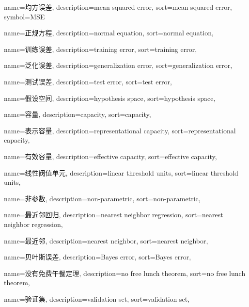 {
  name=均方误差,
  description={mean squared error},
  sort={mean squared error},
  symbol={MSE}
}

{
  name=正规方程,
  description={normal equation},
  sort={normal equation},
}

{
  name=训练误差,
  description={training error},
  sort={training error},
}

{
  name=泛化误差,
  description={generalization error},
  sort={generalization error},
}

{
  name=测试误差,
  description={test error},
  sort={test error},
}

{
  name=假设空间,
  description={hypothesis space},
  sort={hypothesis space},
}

{
  name=容量,
  description={capacity},
  sort={capacity},
}

{
  name=表示容量,
  description={representational capacity},
  sort={representational capacity},
}

{
  name=有效容量,
  description={effective capacity},
  sort={effective capacity},
}

{
	name=线性阀值单元,
	description={linear threshold units},
	sort={linear threshold units},
}


{
  name=非参数,
  description={non-parametric},
  sort={non-parametric},
}

{
  name=最近邻回归,
  description={nearest neighbor regression},
  sort={nearest neighbor regression},
}

{
  name=最近邻,
  description={nearest neighbor},
  sort={nearest neighbor},
}

{
  name=贝叶斯误差,
  description={Bayes error},
  sort={Bayes error},
}

{
  name=没有免费午餐定理,
  description={no free lunch theorem},
  sort={no free lunch theorem},
}



{
  name=验证集,
  description={validation set},
  sort={validation set},
}


